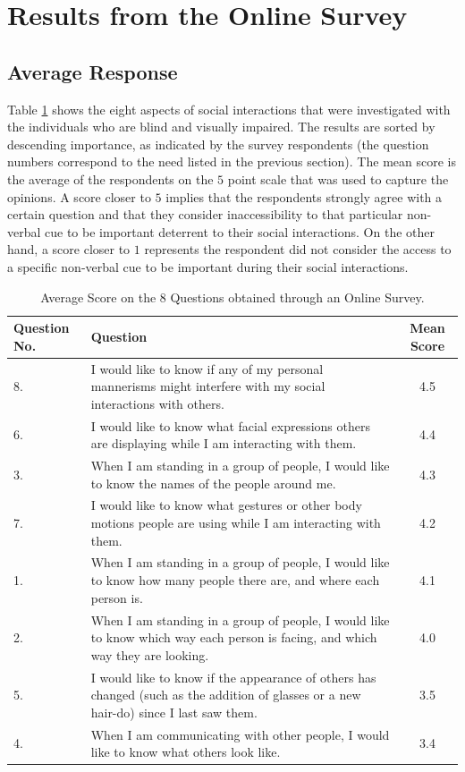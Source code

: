 \documentclass[oneside,11pt]{memoir}
\begin{document}
\section{Results from the Online Survey}
\subsection{Average Response}
Table \ref{Tab:Table5} shows the eight aspects of social interactions that were investigated with the individuals who are blind and visually impaired. The results are sorted by descending importance, as indicated by the survey respondents (the question numbers correspond to the need listed in the previous section). The mean score is the average of the respondents on the $5$ point scale that was used to capture the opinions.  A score closer to $5$ implies that the respondents strongly agree with a certain question and that they consider inaccessibility to that particular non-verbal cue to be important deterrent to their social interactions. On the other hand, a score closer to $1$ represents the respondent did not consider the access to a specific non-verbal cue to be important during their social interactions.

\begin{table}[h]
\caption{Average Score on the 8 Questions obtained through an Online Survey.}
\label{Tab:Table5}
\begin{center}
\begin{tabularx}{5in}{|l|X|c|}
\hline
Question No. & Question & Mean Score\\
\hline
8. & I would like to know if any of my personal mannerisms might interfere with my social interactions with others. & 4.5 \\
\hline
6. & I would like to know what facial expressions others are displaying while I am interacting with them. & 4.4 \\
\hline
3. & When I am standing in a group of people, I would like to know the names of the people around me. & 4.3 \\
\hline
7. & I would like to know what gestures or other body motions people are using while I am interacting with them. & 4.2 \\
\hline
1. & When I am standing in a group of people, I would like to know how many people there are, and where each person is. & 4.1 \\
\hline
2. & When I am standing in a group of people, I would like to know which way each person is facing, and which way they are looking. & 4.0 \\
\hline
5. & I would like to know if the appearance of others has changed (such as the addition of glasses or a new hair-do) since I last saw them. & 3.5 \\
\hline
4. & When I am communicating with other people, I would like to know what others look like. & 3.4 \\
\hline
\end{tabularx}
\end{center}
\end{table}
\end{document}
